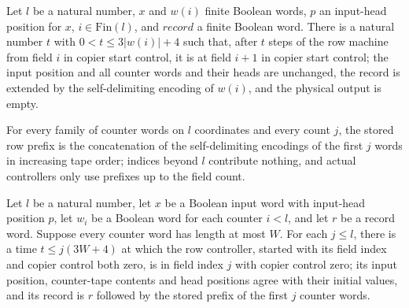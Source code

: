 \begin{lemma}
\label{Complexity.clRow_field}
\leanok
{}
Let $l$ be a natural number, $x$ and $w(i)$ finite Boolean words, $p$ an input-head
position for $x$, $i\in\mathrm{Fin}(l)$, and $record$ a finite Boolean word. There is a
natural number $t$ with $0<t\le 3|w(i)|+4$ such that, after $t$ steps of the row machine
from field $i$ in copier start control, it is at field $i+1$ in copier start control;
the input position and all counter words and their heads are unchanged, the record is
extended by the self-delimiting encoding of $w(i)$, and the physical output is empty.
\end{lemma}

\begin{definition}
\label{Complexity.clRowPrefix}
\leanok
{}
For every family of counter words on $l$ coordinates and every count $j$, the stored row prefix is the concatenation of the self-delimiting encodings of the first $j$ words in increasing tape order; indices beyond $l$ contribute nothing, and actual controllers only use prefixes up to the field count.
\end{definition}

\begin{lemma}
\label{Complexity.clRow_prefix_run}
\leanok
{}
Let $l$ be a natural number, let $x$ be a Boolean input word with input-head position
$p$, let $w_i$ be a Boolean word for each counter $i<l$, and let $r$ be a record word.
Suppose every counter word has length at most $W$. For each $j\le l$, there is a time
$t\le j(3W+4)$ at which the row controller, started with its field index and copier
control both zero, is in field index $j$ with copier control zero; its input position,
counter-tape contents and head positions agree with their initial values, and its record
is $r$ followed by the stored prefix of the first $j$ counter words.
\end{lemma}

